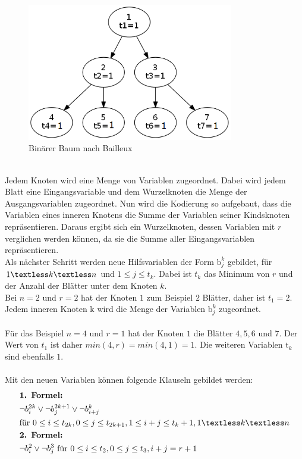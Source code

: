 \documentclass[a4,abstract=on]{scrartcl}
\begin{document}
\begin{figure}[H]
\centering
\includegraphics[width=9cm]{bailleux.png}
\caption{Binärer Baum nach Bailleux}
\label{fig:baum}
\end{figure}
\ \\
Jedem Knoten wird eine Menge von Variablen zugeordnet. Dabei wird jedem Blatt eine Eingangsvariable und dem Wurzelknoten die Menge der Ausgangsvariablen zugeordnet. Nun wird die Kodierung so aufgebaut, dass die Variablen eines inneren Knotens die Summe der Variablen seiner Kindsknoten repräsentieren. Daraus ergibt sich ein Wurzelknoten, dessen Variablen mit $r$ verglichen werden können, da sie die Summe aller Eingangsvariablen repräsentieren.\\
Als nächster Schritt werden neue Hilfsvariablen der Form $\text{b}_j^k$ gebildet, für $1 \textless k \textless n$ und  $1 \leq j \leq t_k$. Dabei ist $t_k$ das Minimum von $r$ und der Anzahl der Blätter unter dem Knoten $k$.\\
 Bei $n=2$ und $r=2$ hat der Knoten $1$ zum Beispiel $2$ Blätter, daher ist $t_1=2$. Jedem inneren Knoten k wird die Menge der Variablen $\text{b}_j^k$ zugeordnet.\\
\ \\
Für das Beispiel $n=4$ und $r =1$ hat der Knoten $1$ die Blätter $4,5,6$ und $7$. Der Wert von $t_1$ ist daher $min(4,r) = min(4,1) = 1$. Die weiteren Variablen $\text{t}_k$ sind ebenfalls $1$.\\
\ \\
Mit den neuen Variablen können folgende Klauseln gebildet werden:\\
\begin{align*}
&\textbf{1. Formel:}\\
&\neg b_i^{2k} \vee \neg b_j^{2k+1} \vee \neg b_{i+j}^{k} \\
&\text{für} {~} 0\leq i \leq t_{2k}, 0\leq j \leq t_{2k+1}, 1\leq i+j \leq t_{k}+1, 1\textless k \textless n\\
&\textbf{2. Formel:}\\
&\neg b_i^2 \vee \neg b_j^3 {~} \text{für} {~} 0\leq i \leq t_2, 0\leq j \leq t_3, i+j = r+1\\
\end{align*}
\end{document}
